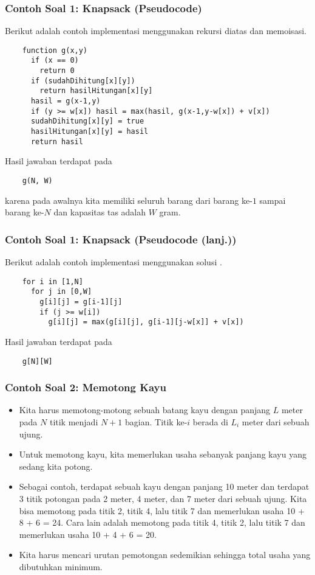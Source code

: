 \begin{frame} [fragile]
\frametitle{Contoh Soal 1: Knapsack (Pseudocode)}
  Berikut adalah contoh implementasi menggunakan rekursi diatas dan memoisasi.
  \begin{lstlisting}
    function g(x,y)
      if (x == 0)
        return 0
      if (sudahDihitung[x][y])
        return hasilHitungan[x][y]
      hasil = g(x-1,y)
      if (y >= w[x]) hasil = max(hasil, g(x-1,y-w[x]) + v[x])
      sudahDihitung[x][y] = true
      hasilHitungan[x][y] = hasil
      return hasil
  \end{lstlisting}
  Hasil jawaban terdapat pada 
  \begin{lstlisting}
    g(N, W)
  \end{lstlisting}
  karena pada awalnya kita memiliki seluruh barang dari barang ke-$1$ sampai barang ke-$N$ dan kapasitas tas adalah $W$ gram.
\end{frame}

\begin{frame} [fragile]
\frametitle{Contoh Soal 1: Knapsack (Pseudocode (lanj.))}
  Berikut adalah contoh implementasi menggunakan solusi .
  \begin{lstlisting}
    for i in [1,N]
      for j in [0,W]
        g[i][j] = g[i-1][j]
        if (j >= w[i])
          g[i][j] = max(g[i][j], g[i-1][j-w[x]] + v[x])
  \end{lstlisting}
  Hasil jawaban terdapat pada
  \begin{lstlisting}
    g[N][W]
  \end{lstlisting}
\end{frame}

\begin{frame}
\frametitle{Contoh Soal 2: Memotong Kayu}
\begin{itemize}
  \item Kita harus memotong-motong sebuah batang kayu dengan panjang $L$ meter pada $N$ titik menjadi $N+1$ bagian. Titik ke-$i$ berada di $L_i$ meter dari sebuah ujung.
  \item Untuk memotong kayu, kita memerlukan usaha sebanyak panjang kayu yang sedang kita potong.
  \item Sebagai contoh, terdapat sebuah kayu dengan panjang 10 meter dan terdapat 3 titik potongan pada 2 meter, 4 meter, dan 7 meter dari sebuah ujung. Kita bisa memotong pada titik 2, titik 4, lalu titik 7 dan memerlukan usaha 10 + 8 + 6 = 24. Cara lain adalah memotong pada titik 4, titik 2, lalu titik 7 dan memerlukan usaha 10 + 4 + 6 = 20.
  \item Kita harus mencari urutan pemotongan sedemikian sehingga total usaha yang dibutuhkan minimum.
\end{itemize}
\end{frame}

